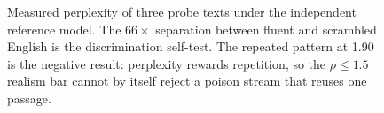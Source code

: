 \begin{figure}[t]\centering
{}
\caption{Measured perplexity of three probe texts under the
independent reference model. The $66\times$ separation between fluent
and scrambled English is the discrimination self-test. The repeated
pattern at 1.90 is the negative result: perplexity rewards repetition,
so the $\rho \le 1.5$ realism bar cannot by itself reject a poison
stream that reuses one passage.}
\label{fig:fluency}
\end{figure}
